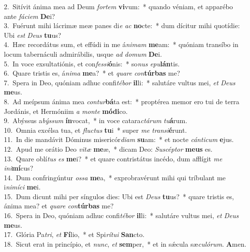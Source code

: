 {2.~}Sitívit ánima mea ad Deum \textit{for}\textit{tem} \textbf{vi}vum:~* quando véniam, et apparébo ante \textit{fá}\textit{ci}\textit{em} \textbf{De}i?\\
{3.~}Fuérunt mihi lácrimæ meæ panes di\textit{e} \textit{ac} \textbf{no}cte:~* dum dícitur mihi quotídie: Ubi \textit{est} \textit{De}\textit{us} \textbf{tu}us?\\
{4.~}Hæc recordátus sum, et effúdi in me á\textit{ni}\textit{mam} \textbf{me}am:~* quóniam transíbo in locum tabernáculi admirábilis, usque \textit{ad} \textit{do}\textit{mum} \textbf{De}i.\\
{5.~}In voce exsultatiónis, et con\textit{fes}\textit{si}\textbf{ó}nis:~* so\textit{nus} \textit{e}\textit{pu}\textbf{lán}tis.\\
{6.~}Quare tristis es, á\textit{ni}\textit{ma} \textbf{me}a?~* et \textit{qua}\textit{re} \textit{con}\textbf{túr}\textbf{bas} me?\\
{7.~}Spera in Deo, quóniam adhuc confi\textit{té}\textit{bor} \textbf{il}li:~* salutáre vultus mei, \textit{et} \textit{De}\textit{us} \textbf{me}us.\\
{8.~}Ad meípsum ánima mea \textit{con}\textit{tur}\textbf{bá}ta est:~* proptérea memor ero tui de terra Jordánis, et Hermóniim \textit{a} \textit{mon}\textit{te} \textbf{mó}\textbf{di}co.\\
{9.~}Abýssus a\textit{býs}\textit{sum} \textbf{ín}vocat,~* in voce catara\textit{ctá}\textit{rum} \textit{tu}\textbf{á}rum.\\
{10.~}Omnia excélsa tua, et \textit{flu}\textit{ctus} \textbf{tu}i~* super \textit{me} \textit{tran}\textit{si}\textbf{é}runt.\\
{11.~}In die mandávit Dóminus misericór\textit{di}\textit{am} \textbf{su}am:~* et nocte \textit{cán}\textit{ti}\textit{cum} \textbf{e}jus.\\
{12.~}Apud me orátio Deo \textit{vi}\textit{tæ} \textbf{me}æ,~* dicam Deo: \textit{Su}\textit{scép}\textit{tor} \textbf{me}\textbf{us} es.\\
{13.~}Quare oblí\textit{tus} \textit{es} \textbf{me}i?~* et quare contristátus incédo, dum afflígit \textit{me} \textit{i}\textit{ni}\textbf{mí}cus?\\
{14.~}Dum confringúntur \textit{os}\textit{sa} \textbf{me}a,~* exprobravérunt mihi qui tríbulant me i\textit{ni}\textit{mí}\textit{ci} \textbf{me}i.\\
{15.~}Dum dicunt mihi per síngulos dies: Ubi est \textit{De}\textit{us} \textbf{tu}us?~* quare tristis es, ánima mea? et \textit{qua}\textit{re} \textit{con}\textbf{túr}\textbf{bas} me?\\
{16.~}Spera in Deo, quóniam adhuc confi\textit{té}\textit{bor} \textbf{il}li:~* salutáre vultus mei, \textit{et} \textit{De}\textit{us} \textbf{me}us.\\
{17.~}Glória Pa\textit{tri}, \textit{et} \textbf{Fí}lio,~* et Spi\textit{rí}\textit{tu}\textit{i} \textbf{San}cto.\\
{18.~}Sicut erat in princípio, et \textit{nunc}, \textit{et} \textbf{sem}per,~* et in sǽcula sæ\textit{cu}\textit{ló}\textit{rum}. \textbf{A}men.\\
